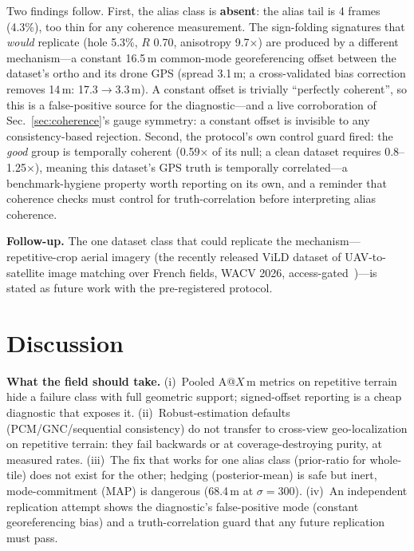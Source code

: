 \documentclass[journal]{IEEEtran}
\begin{document}
Two findings follow. First, the alias class is \textbf{absent}: the alias tail is 4 frames (4.3\%), too thin for any coherence measurement. The sign-folding signatures that \emph{would} replicate (hole 5.3\%, $R$ 0.70, anisotropy 9.7$\times$) are produced by a different mechanism---a constant 16.5\,m common-mode georeferencing offset between the dataset's ortho and its drone GPS (spread 3.1\,m; a cross-validated bias correction removes 14\,m: 17.3$\to$3.3\,m). A constant offset is trivially ``perfectly coherent'', so this is a false-positive source for the diagnostic---and a live corroboration of Sec.~\ref{sec:coherence}'s gauge symmetry: a constant offset is invisible to any consistency-based rejection. Second, the protocol's own control guard fired: the \emph{good} group is temporally coherent (0.59$\times$ of its null; a clean dataset requires 0.8--1.25$\times$), meaning this dataset's GPS truth is temporally correlated---a benchmark-hygiene property worth reporting on its own, and a reminder that coherence checks must control for truth-correlation before interpreting alias coherence.

\textbf{Follow-up.} The one dataset class that could replicate the mechanism---repetitive-crop aerial imagery (the recently released ViLD dataset of UAV-to-satellite image matching over French fields, WACV 2026, access-gated~\cite{vild})---is stated as future work with the pre-registered protocol.

\section{Discussion}

\textbf{What the field should take.} (i)~Pooled A@$X$\,m metrics on repetitive terrain hide a failure class with full geometric support; signed-offset reporting is a cheap diagnostic that exposes it. (ii)~Robust-estimation defaults (PCM/GNC/sequential consistency) do not transfer to cross-view geo-localization on repetitive terrain: they fail backwards or at coverage-destroying purity, at measured rates. (iii)~The fix that works for one alias class (prior-ratio for whole-tile) does not exist for the other; hedging (posterior-mean) is safe but inert, mode-commitment (MAP) is dangerous (68.4\,m at $\sigma=300$). (iv)~An independent replication attempt shows the diagnostic's false-positive mode (constant georeferencing bias) and a truth-correlation guard that any future replication must pass.
\end{document}
